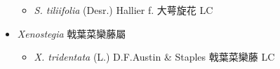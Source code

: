 \begin{itemize}
  \begin{itemize}
        \item[] \textit{S. tiliifolia} (Desr.) Hallier f.  大萼旋花   LC
  \end{itemize}
 \item[] \textit{Xenostegia} 戟葉菜欒藤屬
                                
  \begin{itemize}
        \item[] \textit{X. tridentata} (L.) D.F.Austin \& Staples  戟葉菜欒藤   LC
  \end{itemize}
  \end{itemize}
